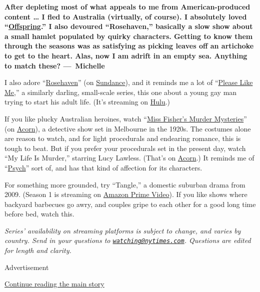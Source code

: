 \textbf{After depleting most of what appeals to me from
American-produced content \ldots{} I fled to Australia (virtually, of
course). I absolutely loved
``\href{https://www.netflix.com/title/80118289}{Offspring}.'' I also
devoured ``Rosehaven,'' basically a slow show about a small hamlet
populated by quirky characters. Getting to know them through the seasons
was as satisfying as picking leaves off an artichoke to get to the
heart. Alas, now I am adrift in an empty sea. Anything to match these?
---~Michelle}

I also adore
``\href{https://www.nytimes.com/watching/titles/rosehaven}{Rosehaven}''
(on \href{https://www.sundancetv.com/shows/rosehaven--27554}{Sundance}),
and it reminds me a lot of
``\href{https://www.nytimes.com/watching/recommendations/please-like-me}{Please
Like Me},'' a similarly darling, small-scale series, this one about a
young gay man trying to start his adult life. (It's streaming on
\href{https://www.hulu.com/series/please-like-me-172a0482-c365-4225-935e-255d45314c52}{Hulu}.)

If you like plucky Australian heroines, watch
``\href{https://www.nytimes.com/watching/recommendations/miss-fishers-murder-mysteries}{Miss
Fisher's Murder Mysteries}'' (on
\href{https://acorn.tv/missfisher/}{Acorn}), a detective show set in
Melbourne in the 1920s. The costumes alone are reason to watch, and for
light procedurals and endearing romance, this is tough to beat. But if
you prefer your procedurals set in the present day, watch ``My Life Is
Murder,'' starring Lucy Lawless. (That's on
\href{https://acorn.tv/mylifeismurder/}{Acorn}.) It reminds me of
``\href{https://www.nytimes.com/watching/recommendations/watching-tv-psych}{Psych}''
sort of, and has that kind of affection for its characters.

For something more grounded, try ``Tangle,'' a domestic suburban drama
from 2009. (Season 1 is streaming on
\href{https://www.amazon.com/Tangle/dp/B07TSB82WF}{Amazon Prime Video}).
If you like shows where backyard barbecues go awry, and couples gripe to
each other for a good long time before bed, watch this.

\emph{Series' availability on streaming platforms is subject to change,
and varies by country. Send in your questions to
\href{mailto:watching@nytimes.com}{\nolinkurl{watching@nytimes.com}}.
Questions are edited for length and clarity.}

Advertisement

\protect\hyperlink{after-bottom}{Continue reading the main story}

